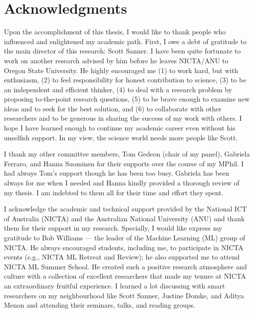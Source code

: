 \chapter*{Acknowledgments}

Upon the accomplishment of this thesis, I would like to thank people who influenced and enlightened my academic path. 
First, I owe a debt of gratitude to the main director of this research: Scott Sanner. I have been quite fortunate to work on another research advised by him before he leaves NICTA/ANU to Oregon State University. He highly encouraged me  (1) to work hard, but with enthusiasm, (2) to feel responsibility for honest contribution to science, (3) to be an independent and efficient thinker, (4) to deal with a research problem by proposing to-the-point research questions, (5) to be brave enough to examine new ideas and to seek for the best solution, and (6) to collaborate with other researchers and to be generous in sharing the success of my work with others. I hope I have learned enough to continue my academic career even without his unselfish support. In my view, the science world needs more people like Scott. 

I thank my other committee members, Tom Gedeon (chair of my panel), Gabriela Ferraro, and Hanna Suominen for their supports over the course of my MPhil. I had always Tom's support though he has been too busy. Gabriela has been always for me when I needed and Hanna kindly provided a thorough review of my thesis. 
I am indebted to them all for their time and effort they spent. 

I acknowledge the academic and technical support provided by the
National ICT of Australia (NICTA) and the Australian National University (ANU)
and thank them for their support in my research. Specially, I would like express my gratitude to Bob Williams --- the leader of the Machine Learning (ML) group of NICTA. He always encouraged students, including me, to participate in NICTA events (e.g., NICTA ML Retreat and Review); he also supported me to attend NICTA ML Summer School. He created such a positive research atmosphere and culture with a collection of excellent researchers that made my tenure at NICTA an extraordinary fruitful experience. I learned a lot discussing with smart researchers on my neighbourhood like Scott Sanner, Justine Domke, and Aditya Menon and attending their seminars, talks, and reading groups. 

